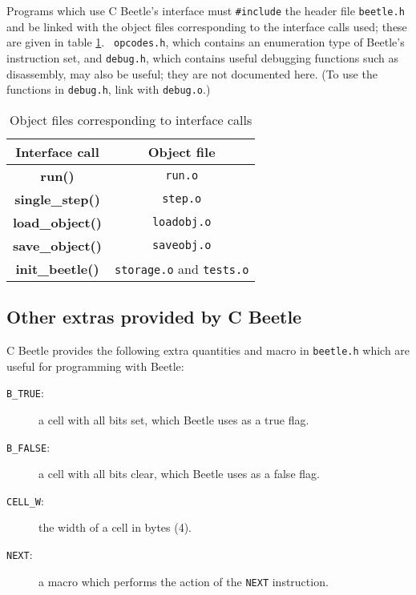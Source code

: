 Programs which use C Beetle's interface must {\tt \#include} the header file
{\tt beetle.h} and be linked with the object files corresponding to the
interface calls used; these are given in table \ref{objtable}. {\tt
opcodes.h}, which contains an enumeration type of Beetle's instruction set,
and {\tt debug.h}, which contains useful debugging functions such as
disassembly, may also be useful; they are not documented here. (To use the
functions in {\tt debug.h}, link with {\tt debug.o}.)

\begin{table}
\begin{center}
\begin{tabular}{|c|c|} \hline
\rule[-2mm]{0mm}{6mm}\bf Interface call & \bf Object file \\ \hline
{\bf run()} & {\tt run.o} \\
{\bf single\_step()} & {\tt step.o} \\
{\bf load\_object()} & {\tt loadobj.o} \\
{\bf save\_object()} & {\tt saveobj.o} \\
{\bf init\_beetle()} & {\tt storage.o} and {\tt tests.o} \\  \hline
\end{tabular}
\caption{\label{objtable}Object files corresponding to interface calls}
\end{center}
\end{table}


\subsection{Other extras provided by C Beetle}

C Beetle provides the following extra quantities and macro in {\tt beetle.h}
which are useful for programming with Beetle:

\begin{description}
\item[{\tt B\_TRUE}:] a cell with all bits set, which Beetle uses as a true
flag.
\item[{\tt B\_FALSE}:] a cell with all bits clear, which Beetle uses as a
false flag.
\item[{\tt CELL\_W}:] the width of a cell in bytes (4).
\item[{\tt NEXT}:] a macro which performs the action of the {\tt NEXT}
instruction.
\end{description}
